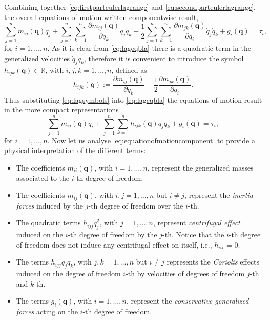 		Combining together \cref{eq:firstparteulerlagrange} and \cref{eq:secondparteulerlagrange},
		the overall equations of motion written componentwise result,
		\begin{equation}
			\label{eq:lageqbla}
			\sum_{j=1}^{n}m_{ij}(\bm{q})\ddot{q}_{j} +
			\sum_{j=1}^{n}\sum_{k=1}^{n}\frac{\partial m_{ij}(\bm{q})}{\partial q_{k}}\dot{q}_{j}\dot{q}_{k}
			-\frac{1}{2}\sum_{j=1}^{n}\sum_{k=1}^{n}
			\frac{\partial m_{jk}(\bm{q})}{\partial q_{i}}
			\dot{q}_{j}\dot{q}_{k}+g_{i}(\bm{q}) = \tau_{i},
		\end{equation}
		for $i=1,\dots,n$. As it is clear from \cref{eq:lageqbla} there 
		is a quadratic term in the generalized velocities $\dot{q}_{j}\dot{q}_{k}$,
		therefore it is convenient to introduce the symbol $h_{ijk}(\bm{q})\in\mathbb{R}$,
		with $i,j,k = 1,\dots,n$, defined as
		\begin{equation}
			\label{eq:lagsymbols}
			h_{ijk}(\bm{q}) := \frac{\partial m_{ij}(\bm{q})}{\partial q_{k}}
			-\frac{1}{2}\frac{\partial m_{jk}(\bm{q})}{\partial q_{i}}. 
		\end{equation}
		Thus substituting \cref{eq:lagsymbols} into \cref{eq:lageqbla}
		the equations of motion result in the more compact representations
		\begin{equation}
			\label{eq:equationofmotioncomponent}
			\sum_{j=1}^{n}m_{ij}(\bm{q})\ddot{q}_{i} +
			\sum_{j=1}^{n}\sum_{k=1}^{n}h_{ijk}(\bm{q})\dot{q}_{j}\dot{q}_{k} + g_{i}(\bm{q}) = \tau_{i},
		\end{equation}
		for $i=1,\dots,n$. Now let us analyse \cref{eq:equationofmotioncomponent} 
		to provide a physical interpretation of the different terms:
		\begin{itemize}
			\item The coefficients $m_{ii}(\bm{q})$, with $i =1,\dots,n$,
			represent the generalized masses associated to the $i$-th degree of freedom.
			\item The coefficients  $m_{ij}(\bm{q})$, with $i,j =1,\dots,n$ but $i\neq j$, 
			represent the \emph{inertia forces} induced by the $j$-th degree of freedom over the $i$-th. 
			\item The quadratic terms $h_{ijj}\dot{q}_{j}^{2}$, with $j = 1,\dots,n$,
			represent \emph{centrifugal effect} induced on the $i$-th degree of 
			freedom by the $j$-th. Notice that the $i$-th degree of freedom
			does not induce any centrifugal effect on itself, i.e., $h_{iii}$ = 0.
			\item The terms $h_{ijj}\dot{q}_{j}\dot{q}_{k}$, with $j,k=1,\dots,n$
			but $i\neq j$ represents the \emph{Coriolis} effects induced on the
			degree of freedom $i$-th by velocities of degrees of freedom $j$-th and $k$-th.
			\item The terms $g_{i}(\bm{q})$, with $i=1,\dots,n$, represent
			the \emph{conservative generalized forces} acting on the $i$-th degree of freedom.
		\end{itemize}

